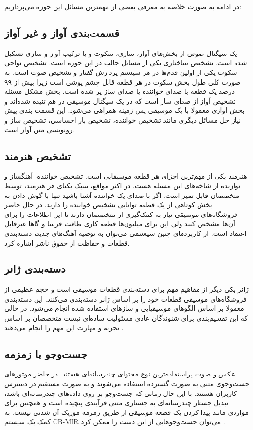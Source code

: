 در ادامه به صورت خلاصه به معرفی بعضی از مهمترین مسائل این حوزه می‌پردازیم:

\subsection{قسمت‌بندی آواز و غیر آواز}
یک سیگنال صوتی از بخش‌های آواز، سازی، سکوت و یا ترکیب آواز و سازی تشکیل شده
است. تشخیص ساختاری یکی از مسائل جالب در این حوزه است. تشخیص نواحی سکوت یکی از
اولین قدم‌ها در هر سیستم پردازش گفتار و تشخیص صوت است. به صورت کلی طول بخش سکوت
در هر قطعه قابل چشم پوشی است زیرا بیش از ۹۹ درصد یک قطعه با صدای خواننده یا
صدای ساز پر شده است. بخش مشکل مسئله تشخیص آواز از صدای ساز است که در یک سیگنال
موسیقی در هم تنیده شده‌اند و بخش آوازی معمولا با یک موسیقی پس زمینه همراهی
می‌شود. این قسمت بندی پیش نیاز حل مسائل دیگری مانند تشخیص خواننده، تشخیص بار
احساسی، تشخیص ساز و رونویسی متن آواز است.

\subsection{تشخیص هنرمند}
هنرمند یکی از مهم‌ترین اجزای هر قطعه موسیقایی است. تشخیص خواننده، آهنگساز و
نوازنده از شاخه‌های این مسئله هست. در اکثر مواقع، سبک یکتای هر هنرمند، توسط
متخصصان قابل تمیز است. اگر با صدای یک خواننده آشنا باشید تنها با گوش دادن به
بخش کوتاهی از یک قطعه توانایی تشخیص خواننده را دارید. در حال حاضر فروشگاه‌های
موسیقی نیاز به کمک‌گیری از متخصصان دارند تا این اطلاعات را برای آن‌ها مشخص کنند
ولی این برای میلیون‌ها قطعه کاری طاقت فرسا و گاها غیرقابل اعتماد است. از
کاربردهای چنین سیستمی می‌توان به توصیه آهنگ‌های جدید، دسته‌بندی قطعات و حفاظت
از حقوق ناشر اشاره کرد.

\subsection{دسته‌بندی ژانر}
ژانر یکی دیگر از مفاهیم مهم برای دسته‌بندی قطعات موسیقی است و حجم عظیمی از
فروشگاه‌های موسیقی قطعات خود را بر اساس ژانر دسته‌بندی می‌کنند. این دسته‌بندی
معمولا بر اساس الگوهای موسیقیایی و سازهای استفاده شده انجام می‌شود. در حالی که
این تقسیم‌بندی برای شنوندگان عادی مسئولیت ساده‌ای نیست متخصصان بر اساس تجربه و
مهارت این مهم را انجام می‌دهند
\cite{perrot1999scanning,scaringella2006automatic}%
.

\subsection{جست‌وجو با زمزمه}
عکس و صوت پراستفاده‌ترین نوع محتوای چندرسانه‌ای هستند. در حاضر موتورهای
جست‌وجوی متنی به صورت گسترده استفاده می‌شوند و به صورت مستقیم در دسترس کاربران
هستند. با این حال زمانی که جست‌وجو بر روی داده‌های چندرسانه‌ای باشد، تبدیل
جستار چندرسانه‌ای به جستاری متنی فرآیندی پیچیده است و همچنین برای مواردی
مانند پیدا کردن یک قطعه موسیقی از طریق زمزمه موزیک آن شدنی نیست. به کمک یک سیستم
CB-MIR
می‌توان جست‌وجوهایی از این دست را ممکن کرد
\cite{yoshitaka1999survey}%
.

